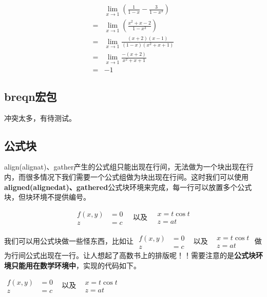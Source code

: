\begin{equation}
\begin{split}
&\lim\limits_{x\to 1}\left(\frac{1}{1-x}-\frac{3}{1-x^3}\right)\\
= &\lim\limits_{x\to 1}\left(\frac{x^2+x-2}{1-x^3}\right)  \\
= & \lim\limits_{x\to 1}\frac{(x+2)(x-1)}{(1-x)(x^2+x+1)}\\
= & \lim\limits_{x\to 1}\frac{-(x+2)}{x^2+x+1}\\
= & -1
\end{split}
\end{equation}

\subsection{breqn宏包}
冲突太多，有待测试。

\subsection{公式块}

align(alignat)、gather产生的公式组只能出现在行间，无法做为一个块出现在行内，而很多情况下我们需要一个公式组做为块出现在行间。这时我们可以使用\textbf{aligned(alignedat)、gathered}公式块环境来完成，每一行可以放置多个公式块，但块环境不提供编号。

\begin{codeshow}
\begin{equation}
\begin{aligned}
f(x,y) & =0 \\
z & =c
\end{aligned}
\quad \text{以及} \quad
\begin{gathered}
x=t\cos t \\
z=at
\end{gathered}
\end{equation}
\end{codeshow}

我们可以用公式块做一些怪东西，比如让
$\begin{aligned}f(x,y) & =0 \\z & =c\end{aligned}$
~以及~
$\begin{gathered}x=t\cos t \\z=at\end{gathered}$
做为行间公式出现在一行。让人想起了高数书上的排版呢！！需要注意的是\textbf{公式块环境只能用在数学环境中}，实现的代码如下。

\begin{latex}
$\begin{aligned}f(x,y) & =0 \\z & =c\end{aligned}$
~以及~
$\begin{gathered}x=t\cos t \\z=at\end{gathered}$
\end{latex}

